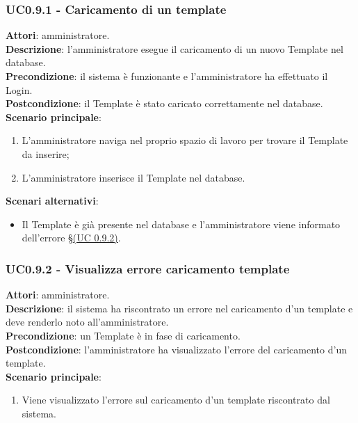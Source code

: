 \subsubsection{UC0.9.1 - Caricamento di un template}{
	\label{uc0.9.1}
	\textbf{Attori}: amministratore. \\
	\textbf{Descrizione}: l'amministratore esegue il caricamento di un nuovo Template nel database. \\
	\textbf{Precondizione}: il sistema  è funzionante e l'amministratore ha effettuato il Login.	\\
	\textbf{Postcondizione}: il Template è stato caricato correttamente nel database.	\\
	\textbf{Scenario principale}:
	\begin{enumerate}
		\item L'amministratore naviga nel proprio spazio di lavoro  per trovare il Template da inserire;
		\item L'amministratore inserisce il Template nel database.
	\end{enumerate}
	\textbf{Scenari alternativi}:
	\begin{itemize}
		\item Il Template è già presente nel database e l'amministratore viene informato dell'errore \S\hyperref[uc0.9.2]{(UC 0.9.2)}.
	\end{itemize}
	}
\subsubsection{UC0.9.2 - Visualizza errore caricamento template}{
	\label{uc0.9.2}
	\textbf{Attori}: amministratore. \\
	\textbf{Descrizione}: il sistema ha riscontrato un errore nel caricamento d'un template e deve renderlo noto all'amministratore. \\
	\textbf{Precondizione}: un Template è in fase di caricamento.	\\
	\textbf{Postcondizione}: l'amministratore ha visualizzato l'errore del caricamento d'un template.	\\
	\textbf{Scenario principale}:
	\begin{enumerate}
		\item Viene visualizzato l'errore sul caricamento d'un template riscontrato dal sistema.
	\end{enumerate}
	}
